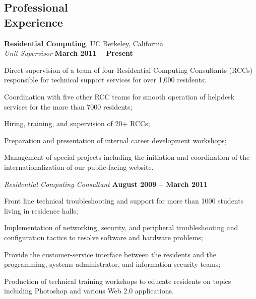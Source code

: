 \documentclass[margin,line]{resume}
\begin{document}
\begin{resume}
    \section{\mysidestyle Professional\\Experience}

    \textbf{Residential Computing}, UC Berkeley, California \vspace{1mm}\\\vspace{0mm}%
    \textsl{Unit Supervisor} \hfill \textbf{March 2011 -- Present}
    \begin{list2}
		\item Direct supervision of a team of four Residential Computing Consultants (RCCs) responsible for technical support services for over 1,000 residents;
        \item Coordination with five other RCC teams for smooth operation of helpdesk services for the more than 7000 residents;
		\item Hiring, training, and supervision of 20+ RCCs;
		\item Preparation and presentation of internal career development workshops;
		\item Management of special projects including the initiation and coordination of the internationalization of our public-facing website.
    \end{list2}\vspace{-1.5mm}

	
	\textsl{Residential Computing Consultant} \hfill \textbf{August 2009 -- March 2011}
	\begin{list2}
		\item Front line technical troubleshooting and support for more than 1000 students living in residence halls;
		\item Implementation of networking, security, and peripheral troubleshooting and configuration tactics to resolve software and hardware problems;
		\item Provide the customer-service interface between the residents and the programming, systems administrator, and information security teams;
		\item Production of technical training workshops to educate residents on topics including Photoshop and various Web 2.0 
	applications. 
	\end{list2}\vspace{-1.5mm}


\end{resume}
\end{document}
